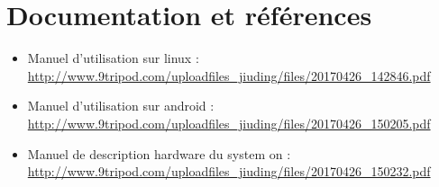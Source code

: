 \section{Documentation et références}

\vspace{4mm}

\begin{itemize}

  \item Manuel d'utilisation sur linux :\\
    \newline
    \url{http://www.9tripod.com/uploadfiles_jiuding/files/20170426_142846.pdf}
    \newline

  \item Manuel d'utilisation sur android :\\
    \newline
    \url{http://www.9tripod.com/uploadfiles_jiuding/files/20170426_150205.pdf}
    \newline

  \item Manuel de description hardware du system on :\\
    \newline
    \url{http://www.9tripod.com/uploadfiles_jiuding/files/20170426_150232.pdf}
    \newline

\end{itemize}

\newpage
